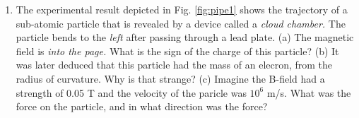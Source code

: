 \documentclass[10pt]{article}
\begin{document}
\begin{enumerate}
\item The experimental result depicted in Fig. \ref{fig:pipe1} shows the trajectory of a sub-atomic particle that is revealed by a device called a \textit{cloud chamber.}  The particle bends to the \textit{left} after passing through a lead plate.  (a) The magnetic field is \textit{into the page.}  What is the sign of the charge of this particle? (b) It was later deduced that this particle had the mass of an elecron, from the radius of curvature.  Why is that strange? (c) Imagine the B-field had a strength of 0.05 T and the velocity of the paricle was $10^{6}$ m/s.  What was the force on the particle, and in what direction was the force?
\end{enumerate}
\end{document}
